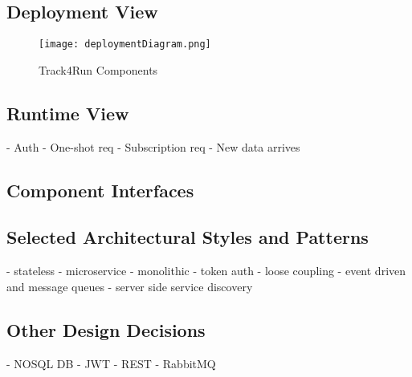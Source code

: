 \subsection{Deployment View}

\FloatBarrier
\begin{figure}[!h]
	\centering
	\texttt{[image: deploymentDiagram.png]}
	\caption{Track4Run Components}
\end{figure}
\FloatBarrier

\subsection{Runtime View}
- Auth
- One-shot req
- Subscription req
- New data arrives

\subsection{Component Interfaces}
\subsection{Selected Architectural Styles and Patterns}
- stateless
- microservice
- monolithic
- token auth
- loose coupling
- event driven and message queues
- server side service discovery
\subsection{Other Design Decisions}
- NOSQL DB
- JWT
- REST
- RabbitMQ